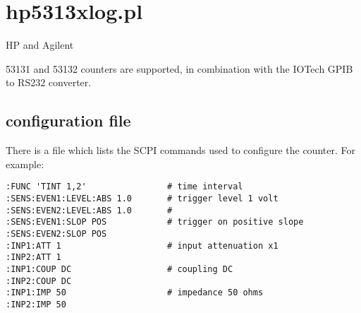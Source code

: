 \section{hp5313xlog.pl}

\hypertarget{h:hp5313xlog}{HP and Agilent} 53131 and 53132 counters are supported, in combination
with the IOTech GPIB to RS232 converter.

\subsection{configuration file}

There is a file  which lists the SCPI commands used to configure the counter.
For example:
\begin{lstlisting}
:FUNC 'TINT 1,2'                # time interval
:SENS:EVEN1:LEVEL:ABS 1.0       # trigger level 1 volt
:SENS:EVEN2:LEVEL:ABS 1.0       #
:SENS:EVEN1:SLOP POS            # trigger on positive slope
:SENS:EVEN2:SLOP POS
:INP1:ATT 1                     # input attenuation x1
:INP2:ATT 1
:INP1:COUP DC                   # coupling DC
:INP2:COUP DC
:INP1:IMP 50                    # impedance 50 ohms
:INP2:IMP 50
\end{lstlisting}